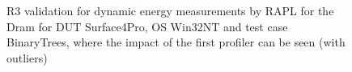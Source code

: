 \begin{figure}
                            \caption{R3 validation for dynamic energy measurements by RAPL for the Dram for DUT Surface4Pro, OS Win32NT and test case BinaryTrees, where the impact of the first profiler can be seen (with outliers)} \label{fig:Surface4Pro_RAPL_Dram_R3_dynamic_energy_with_outliers_Win32NT_avg_watts}
                            \end{figure}
                            